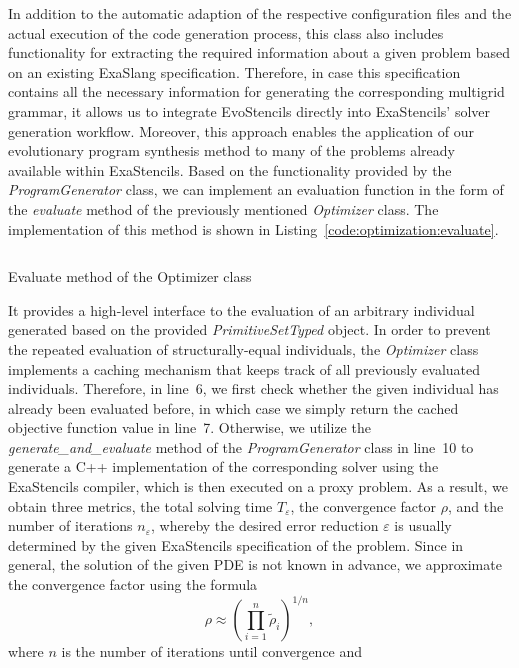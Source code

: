 In addition to the automatic adaption of the respective configuration files and the actual execution of the code generation process, this class also includes functionality for extracting the required information about a given problem based on an existing ExaSlang specification. 
Therefore, in case this specification contains all the necessary information for generating the corresponding multigrid grammar, it allows us to integrate EvoStencils directly into ExaStencils' solver generation workflow.
Moreover, this approach enables the application of our evolutionary program synthesis method to many of the problems already available within ExaStencils.
Based on the functionality provided by the \emph{ProgramGenerator} class, we can implement an evaluation function in the form of the \emph{evaluate} method of the previously mentioned \emph{Optimizer} class.
The implementation of this method is shown in Listing~\ref{code:optimization:evaluate}.
\begin{listing}
	\inputminted[linenos]{python}{evostencils/optimization/evaluate.py}
	\caption{Evaluate method of the Optimizer class}
	\label{code:optimization:evaluate}
\end{listing}
It provides a high-level interface to the evaluation of an arbitrary individual generated based on the provided \emph{PrimitiveSetTyped} object.
In order to prevent the repeated evaluation of structurally-equal individuals, the \emph{Optimizer} class implements a caching mechanism that keeps track of all previously evaluated individuals.
Therefore, in line~6, we first check whether the given individual has already been evaluated before, in which case we simply return the cached objective function value in line~7.
Otherwise, we utilize the \emph{generate\_and\_evaluate} method of the \emph{ProgramGenerator} class in line~10 to generate a C++ implementation of the corresponding solver using the ExaStencils compiler, which is then executed on a proxy problem.
As a result, we obtain three metrics, the total solving time $T_\varepsilon$, the convergence factor $\rho$, and the number of iterations $n_\varepsilon$, whereby the desired error reduction $\varepsilon$ is usually determined by the given ExaStencils specification of the problem.
Since in general, the solution of the given PDE is not known in advance, we approximate the convergence factor using the formula
\begin{equation}\label{eq:asymptotic_convergence_factor}
	\rho \approx \left(\prod_{i=1}^{n}\tilde{\rho}_i \right)^{1/n},
\end{equation} where $n$ is the number of iterations until convergence and
